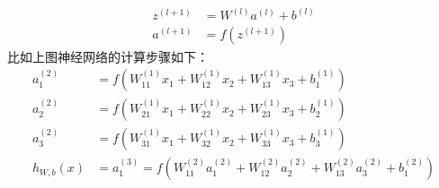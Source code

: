 \documentclass[UTF8]{ctexart}
\begin{document}
	\begin{align*} 
		z^{(l+1)} &= W^{(l)} a^{(l)} + b^{(l)} \\ a^{(l+1)} &= f(z^{(l+1)}) 
	\end{align*} 
	比如上图神经网络的计算步骤如下：
	\begin{align*} 
	a_1^{(2)} &= f(W_{11}^{(1)}x_1 + W_{12}^{(1)} x_2 + W_{13}^{(1)} x_3 + b_1^{(1)}) \\ a_2^{(2)} &= f(W_{21}^{(1)}x_1 + W_{22}^{(1)} x_2 + W_{23}^{(1)} x_3 + b_2^{(1)}) \\ a_3^{(2)} &= f(W_{31}^{(1)}x_1 + W_{32}^{(1)} x_2 + W_{33}^{(1)} x_3 + b_3^{(1)}) \\ h_{W,b}(x) &= a_1^{(3)} = f(W_{11}^{(2)}a_1^{(2)} + W_{12}^{(2)} a_2^{(2)} + W_{13}^{(2)} a_3^{(2)} + b_1^{(2)}) 
	\end{align*} 
	
\end{document}
